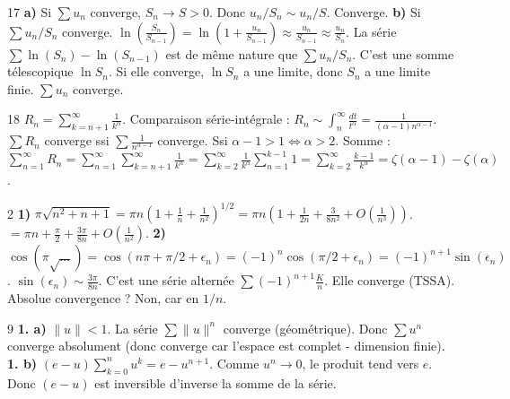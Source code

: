 \begin{correction}{17}
\textbf{a)} Si $\sum u_n$ converge, $S_n \to S > 0$. Donc $u_n/S_n \sim u_n/S$. Converge.
\textbf{b)} Si $\sum u_n/S_n$ converge.
$\ln(\frac{S_n}{S_{n-1}}) = \ln(1 + \frac{u_n}{S_{n-1}}) \approx \frac{u_n}{S_{n-1}} \approx \frac{u_n}{S_n}$.
La série $\sum \ln(S_n) - \ln(S_{n-1})$ est de même nature que $\sum u_n/S_n$.
C'est une somme télescopique $\ln S_n$.
Si elle converge, $\ln S_n$ a une limite, donc $S_n$ a une limite finie. $\sum u_n$ converge.
\end{correction}

\begin{correction}{18}
$R_n = \sum_{k=n+1}^\infty \frac{1}{k^\alpha}$.
Comparaison série-intégrale : $R_n \sim \int_n^\infty \frac{dt}{t^\alpha} = \frac{1}{(\alpha-1)n^{\alpha-1}}$.
$\sum R_n$ converge ssi $\sum \frac{1}{n^{\alpha-1}}$ converge.
Ssi $\alpha-1 > 1 \iff \alpha > 2$.
Somme : $\sum_{n=1}^\infty R_n = \sum_{n=1}^\infty \sum_{k=n+1}^\infty \frac{1}{k^\alpha} = \sum_{k=2}^\infty \frac{1}{k^\alpha} \sum_{n=1}^{k-1} 1 = \sum_{k=2}^\infty \frac{k-1}{k^\alpha} = \zeta(\alpha-1) - \zeta(\alpha)$.
\end{correction}

\begin{correction}{2}
\textbf{1)} $\pi\sqrt{n^2+n+1} = \pi n (1 + \frac{1}{n} + \frac{1}{n^2})^{1/2} = \pi n (1 + \frac{1}{2n} + \frac{3}{8n^2} + O(\frac{1}{n^3}))$.
$= \pi n + \frac{\pi}{2} + \frac{3\pi}{8n} + O(\frac{1}{n^2})$.
\textbf{2)} $\cos(\pi\sqrt{\dots}) = \cos(n\pi + \pi/2 + \epsilon_n) = (-1)^n \cos(\pi/2 + \epsilon_n) = (-1)^{n+1} \sin(\epsilon_n)$.
$\sin(\epsilon_n) \sim \frac{3\pi}{8n}$.
C'est une série alternée $\sum (-1)^{n+1} \frac{K}{n}$. Elle converge (TSSA).
Absolue convergence ? Non, car en $1/n$.
\end{correction}

\begin{correction}{9}
\textbf{1. a)} $\|u\| < 1$. La série $\sum \|u\|^n$ converge (géométrique).
Donc $\sum u^n$ converge absolument (donc converge car l'espace est complet - dimension finie).
\textbf{1. b)} $(e-u) \sum_{k=0}^n u^k = e - u^{n+1}$.
Comme $u^n \to 0$, le produit tend vers $e$.
Donc $(e-u)$ est inversible d'inverse la somme de la série.
\end{correction}

